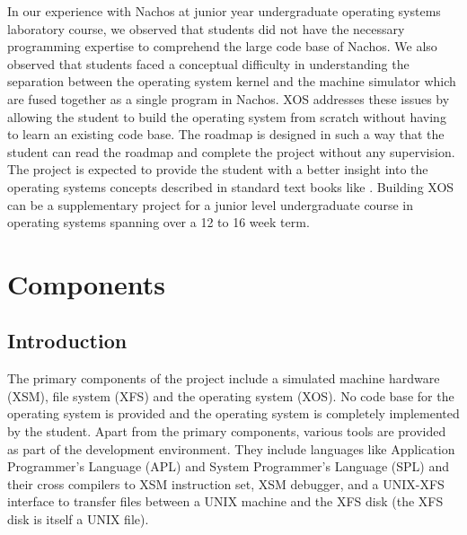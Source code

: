 \documentclass[10pt]{report}
\begin{document}
In our experience with Nachos at junior year undergraduate operating systems laboratory course, we observed that students did not have the necessary programming expertise to comprehend the large code base of Nachos.  We also observed that students faced a conceptual difficulty in understanding the separation between the operating system kernel and the machine simulator which are fused together as a single program in Nachos. XOS addresses these issues by allowing the student to build the operating system from scratch without having to learn an existing code base. The roadmap is designed in such a way that the student can read the roadmap and complete the project without any supervision. The project is expected to provide the student with a better insight into the operating systems concepts described in standard text books like \cite{silberschatz}. Building XOS can be a supplementary project for a junior level undergraduate course in operating systems spanning over a 12 to 16 week term. \\




\chapter{Components}

\section{Introduction}
The primary components of the project include a simulated machine hardware (XSM), file system (XFS) and the operating system (XOS). No code base for the operating system is provided and the operating system is completely implemented by the student. Apart from the primary components, various tools are provided as part of the development environment. They include languages like Application Programmer's Language (APL) and System Programmer's Language (SPL) and their cross compilers to XSM instruction set, XSM debugger, and a UNIX-XFS interface to transfer files between a UNIX machine and the XFS disk (the XFS disk is itself a UNIX file). 
\end{document}
